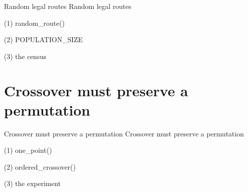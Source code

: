 \begin{frame}{Random legal routes}
Random legal routes
\end{frame}

\begin{frame}[fragile]{(1) random\_route()}

\end{frame}

\begin{frame}[fragile]{(2) POPULATION\_SIZE}

\end{frame}

\begin{frame}[fragile]{(3) the census}

\end{frame}


\section{Crossover must preserve a permutation}

\begin{frame}{Crossover must preserve a permutation}
Crossover must preserve a permutation
\end{frame}

\begin{frame}[fragile]{(1) one\_point()}

\end{frame}

\begin{frame}[fragile]{(2) ordered\_crossover()}

\end{frame}

\begin{frame}[fragile]{(3) the experiment}

\end{frame}

